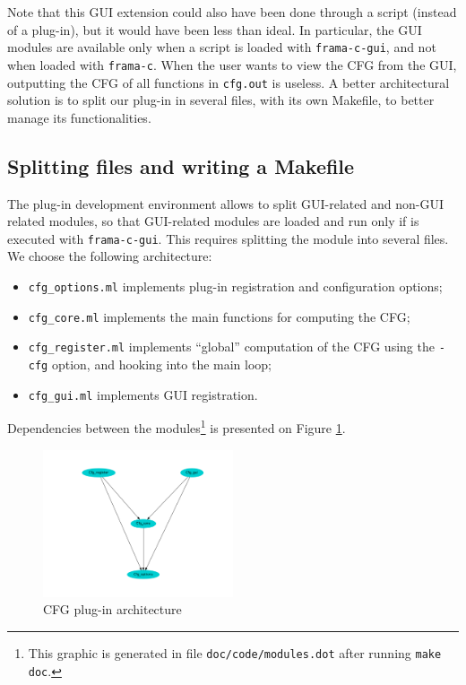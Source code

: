 Note that this GUI extension could also have been done through a script
(instead of a plug-in), but it would have been less than ideal.
In particular, the GUI \ocaml modules are available only when a script
is loaded with \texttt{frama-c-gui}, and not when loaded with
\texttt{frama-c}. When the user wants to view the CFG from the GUI,
outputting the CFG of all functions in \texttt{cfg.out} is useless.
A better architectural solution is to split our plug-in in several files,
with its own Makefile, to better manage its functionalities.

\subsection{Splitting files and writing a Makefile}\label{tut2:makefile}

The \framac plug-in development environment allows to split GUI-related
and non-GUI related modules, so that GUI-related modules are loaded
and run only if \framac is executed with \texttt{frama-c-gui}. This
requires splitting the module into several files. We choose the
following architecture:

\begin{itemize}
\item \texttt{cfg\_options.ml} implements plug-in registration and
  configuration options;
\item \texttt{cfg\_core.ml} implements the main functions for
  computing the CFG;
\item \texttt{cfg\_register.ml} implements ``global'' computation of
  the CFG using the \texttt{-cfg} option, and hooking into the \framac
  main loop;
\item \texttt{cfg\_gui.ml} implements GUI registration.
\end{itemize}

Dependencies between the modules\footnote{This graphic is generated in
  file \texttt{doc/code/modules.dot} after running \texttt{make doc}.}
is presented on Figure \ref{fig:tut:cfgarchitecture}.

\begin{figure}[htbp]
  \centering
    \includegraphics[width=0.5\textwidth]{./tutorial/viewcfg/pdfs/modules.pdf}
  \caption{CFG plug-in architecture}
  \label{fig:tut:cfgarchitecture}
\end{figure}

